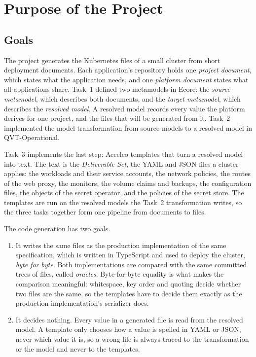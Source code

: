 \section{Purpose of the Project}
\label{sec:purpose}

\subsection{Goals}
\label{sec:goals}

The project generates the Kubernetes files of a small cluster from short
deployment documents. Each application's repository holds one \emph{project
document}, which states what the application needs, and one \emph{platform
document} states what all applications share. Task~1 defined two metamodels in
Ecore: the \emph{source metamodel}, which describes both documents, and the
\emph{target metamodel}, which describes the \emph{resolved model}. A resolved
model records every value the platform derives for one project, and the files
that will be generated from it. Task~2 implemented the model transformation
from source models to a resolved model in QVT-Operational.

Task~3 implements the last step: Acceleo templates that turn a resolved model
into text. The text is the \emph{Deliverable Set}, the YAML and JSON files a
cluster applies: the workloads and their service accounts, the network
policies, the routes of the web proxy, the monitors, the volume claims and
backups, the configuration files, the objects of the secret operator, and the
policies of the secret store. The templates are run on the resolved models the
Task~2 transformation writes, so the three tasks together form one pipeline
from documents to files.

The code generation has two goals.

\begin{enumerate}
  \item It writes the same files as the production implementation of the same
    specification, which is written in TypeScript and used to deploy the
    cluster, \emph{byte for byte}. Both implementations are compared with the
    same committed trees of files, called \emph{oracles}. Byte-for-byte
    equality is what makes the comparison meaningful: whitespace, key order and
    quoting decide whether two files are the same, so the templates have to
    decide them exactly as the production implementation's serializer does.
  \item It decides nothing. Every value in a generated file is read from the
    resolved model. A template only chooses how a value is spelled in YAML or
    JSON, never which value it is, so a wrong file is always traced to the
    transformation or the model and never to the templates.
\end{enumerate}

